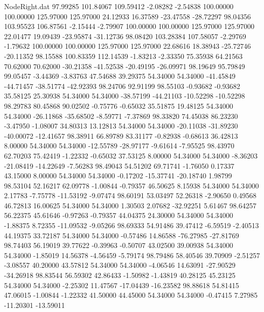 \begin{filecontents}{NodeRight.dat}
  97.99285  101.84067  109.59412    -2.08282   -2.54838  100.00000  100.00000  125.97000  125.97000   24.12933   16.37589  -23.47558  -28.72297
  98.04356  103.95523  106.87561    -2.15444   -2.79907  100.00000  100.00000  125.97000  125.97000   22.01477   19.09439  -23.95874  -31.12736
  98.08420  103.28384  107.58057    -2.29769   -1.79632  100.00000  100.00000  125.97000  125.97000   22.68616   18.38943  -25.72746  -20.11352
  98.15588  100.83359  112.14539    -1.83213   -2.33350   75.35938   64.21563   70.62000   70.62000  -30.21358  -41.52538  -20.49195  -26.09971
  98.19649   95.79849   99.05457    -3.44369   -3.83763   47.54688   39.29375   54.34000   54.34000  -41.45849  -44.71457  -38.51774  -42.92393
  98.24706   92.91199   98.55103    -0.93682   -0.93682   35.58125   25.30938   54.34000   54.34000  -38.57199  -44.21103  -10.52298  -10.52298
  98.29783   80.45868   90.02502    -0.75776   -0.65032   35.51875   19.48125   54.34000   54.34000  -26.11868  -35.68502   -8.59771   -7.37869
  98.33820   74.45038   86.23230    -3.47950   -1.08007   34.80313   13.12813   54.34000   54.34000  -20.11038  -31.89230  -40.00072  -12.41657
  98.38911   66.89789   83.31177    -0.82938   -0.68613   36.42813    8.00000   54.34000   54.34000  -12.55789  -28.97177   -9.61614   -7.95525
  98.43970   62.70203   75.42419    -1.22332   -0.65032   37.53125    8.00000   54.34000   54.34000   -8.36203  -21.08419  -14.22649   -7.56283
  98.49043   54.51202   69.71741    -1.76050    0.17337   43.15000    8.00000   54.34000   54.34000   -0.17202  -15.37741  -20.18740    1.98799
  98.53104   52.16217   62.09778    -1.00844   -0.79357   46.50625    8.15938   54.34000   54.34000    2.17783   -7.75778  -11.53192   -9.07474
  98.60191   53.03497   52.26318    -2.90650    0.49568   46.72813   16.00625   54.34000   54.34000    1.30503    2.07682  -32.92251    5.61467
  98.64257   56.22375   45.61646    -0.97263   -0.79357   44.04375   24.30000   54.34000   54.34000   -1.88375    8.72355  -11.09532   -9.05266
  98.69333   54.91486   39.47412    -6.59519   -2.40513   44.19375   33.72187   54.34000   54.34000   -0.57486   14.86588  -76.27985  -27.81769
  98.74403   56.19019   39.77622    -0.39963   -0.50707   43.02500   39.00938   54.34000   54.34000   -1.85019   14.56378   -4.56459   -5.79174
  98.79486   58.40546   39.70909    -2.51257   -3.08557   40.20000   43.57812   54.34000   54.34000   -4.06546   14.63091  -27.90529  -34.26918
  98.83544   56.59302   42.86433    -1.50982   -1.43819   40.28125   45.23125   54.34000   54.34000   -2.25302   11.47567  -17.04439  -16.23582
  98.88618   54.81415   47.06015    -1.00844   -1.22332   41.50000   44.45000   54.34000   54.34000   -0.47415    7.27985  -11.20301  -13.59011

\end{filecontents}
